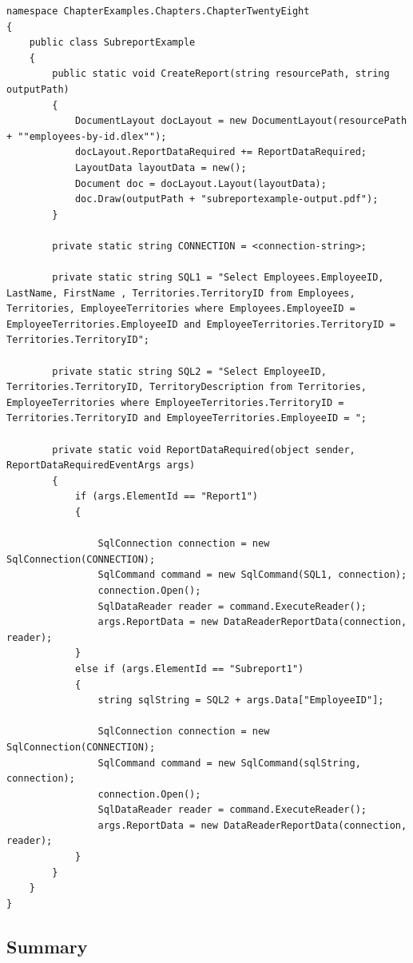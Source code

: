 \documentclass[american,letterpaper]{tufte-book}
\numberwithin{equation}{section}
\numberwithin{figure}{section}
\begin{document}
{{\begin{lstlisting}[caption={Report with subreport.},label={lis:Report-with-subreport.},basicstyle={\small\ttfamily},breaklines=true]
namespace ChapterExamples.Chapters.ChapterTwentyEight
{
    public class SubreportExample
    {
        public static void CreateReport(string resourcePath, string outputPath)
        {
            DocumentLayout docLayout = new DocumentLayout(resourcePath + ""employees-by-id.dlex"");
            docLayout.ReportDataRequired += ReportDataRequired;
            LayoutData layoutData = new();
            Document doc = docLayout.Layout(layoutData);
            doc.Draw(outputPath + "subreportexample-output.pdf");
        }

        private static string CONNECTION = <connection-string>;

        private static string SQL1 = "Select Employees.EmployeeID, LastName, FirstName , Territories.TerritoryID from Employees, Territories, EmployeeTerritories where Employees.EmployeeID = EmployeeTerritories.EmployeeID and EmployeeTerritories.TerritoryID = Territories.TerritoryID";

        private static string SQL2 = "Select EmployeeID, Territories.TerritoryID, TerritoryDescription from Territories, EmployeeTerritories where EmployeeTerritories.TerritoryID = Territories.TerritoryID and EmployeeTerritories.EmployeeID = ";

        private static void ReportDataRequired(object sender, ReportDataRequiredEventArgs args)
        {
            if (args.ElementId == "Report1")
            {

                SqlConnection connection = new SqlConnection(CONNECTION);
                SqlCommand command = new SqlCommand(SQL1, connection);
                connection.Open();
                SqlDataReader reader = command.ExecuteReader();
                args.ReportData = new DataReaderReportData(connection, reader);
            }
            else if (args.ElementId == "Subreport1")
            {
                string sqlString = SQL2 + args.Data["EmployeeID"];

                SqlConnection connection = new SqlConnection(CONNECTION);
                SqlCommand command = new SqlCommand(sqlString, connection);
                connection.Open();
                SqlDataReader reader = command.ExecuteReader();
                args.ReportData = new DataReaderReportData(connection, reader);
            }
        }
    }
}
\end{lstlisting}
\leavevmode\egroup


\subsection{Summary}

}}
\end{document}
